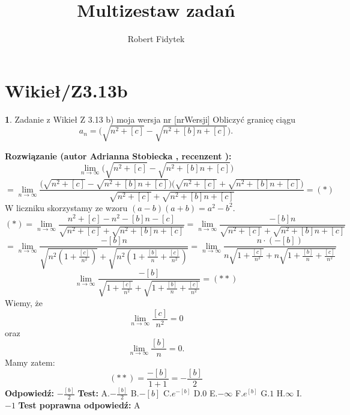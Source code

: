 \documentclass[12pt, a4paper]{article}
\title{Multizestaw zadań}
\author{Robert Fidytek}
\date{}
\theoremstyle{definition} %
\newtheorem{zad}{}
\newcommand{\kategoria}[1]{\section{#1}} %
\newcommand{\zadStart}[1]{\begin{zad}#1\newline} %
\newcommand{\zadStop}{\end{zad}}   %
\newcommand{\rozwStart}[2]{\noindent \textbf{Rozwiązanie (autor #1 , recenzent #2): }\newline} %
\newcommand{\rozwStop}{\newline}                                            %
\newcommand{\odpStart}{\noindent \textbf{Odpowiedź:}\newline}    %
\newcommand{\odpStop}{\newline}                                             %
\newcommand{\testStart}{\noindent \textbf{Test:}\newline} %
\newcommand{\testStop}{\newline} %
\newcommand{\kluczStart}{\noindent \textbf{Test poprawna odpowiedź:}\newline} %
\newcommand{\kluczStop}{\newline} %
\begin{document}
\maketitle


\kategoria{Wikieł/Z3.13b}
\zadStart{Zadanie z Wikieł Z 3.13 b) moja wersja nr [nrWersji]}
Obliczyć granicę ciągu 
$$a_n=\big(\sqrt{n^2+[c]}-\sqrt{n^2+[b]n+[c]}\big).$$
\zadStop
\rozwStart{Adrianna Stobiecka}{}
$$\lim_{n\to\infty}\big(\sqrt{n^2+[c]}-\sqrt{n^2+[b]n+[c]}\big)$$
$$=\lim_{n\to\infty}\frac{\big(\sqrt{n^2+[c]}-\sqrt{n^2+[b]n+[c]}\big)\big(\sqrt{n^2+[c]}+\sqrt{n^2+[b]n+[c]}\big)}{\sqrt{n^2+[c]}+\sqrt{n^2+[b]n+[c]}}=(*)$$
W liczniku skorzystamy ze wzoru $(a-b)(a+b)=a^2-b^2$.
$$(*)=\lim_{n\to\infty}\frac{n^2+[c]-n^2-[b]n-[c]}{\sqrt{n^2+[c]}+\sqrt{n^2+[b]n+[c]}}=\lim_{n\to\infty}\frac{-[b]n}{\sqrt{n^2+[c]}+\sqrt{n^2+[b]n+[c]}}$$
$$=\lim_{n\to\infty}\frac{-[b]n}{\sqrt{n^2(1+\frac{[c]}{n^2})}+\sqrt{n^2(1+\frac{[b]}{n}+\frac{[c]}{n^2})}}=\lim_{n\to\infty}\frac{n\cdot(-[b])}{n\sqrt{1+\frac{[c]}{n^2}}+n\sqrt{1+\frac{[b]}{n}+\frac{[c]}{n^2}}}$$
$$\lim_{n\to\infty}\frac{-[b]}{\sqrt{1+\frac{[c]}{n^2}}+\sqrt{1+\frac{[b]}{n}+\frac{[c]}{n^2}}}=(**)$$
Wiemy, że $$\lim_{n\to\infty}\frac{[c]}{n^2}=0$$
oraz 
$$\lim_{n\to\infty}\frac{[b]}{n}=0.$$
Mamy zatem:
$$(**)=\frac{-[b]}{1+1}=-\frac{[b]}{2}$$
\rozwStop
\odpStart
$-\frac{[b]}{2}$
\odpStop
\testStart
A.$-\frac{[b]}{2}$
B.$-[b]$
C.$e^{-[b]}$
D.$0$
E.$-\infty$
F.$e^{[b]}$
G.$1$
H.$\infty$
I.$-1$
\testStop
\kluczStart
A
\kluczStop
\end{document}

